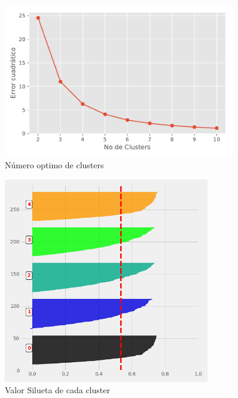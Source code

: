 \begin{figure}[H] 
	\centering
	\includegraphics[width=0.9\textwidth]{Kap4/Clusters}
	\caption{Número optimo de clusters} 
	\label{fig:Clusters}
\end{figure}

\begin{figure}[H] 
	\centering
	\includegraphics[width=0.8\textwidth]{Kap4/S}
	\caption{Valor Silueta de cada cluster} 
	\label{fig:S}
\end{figure}

